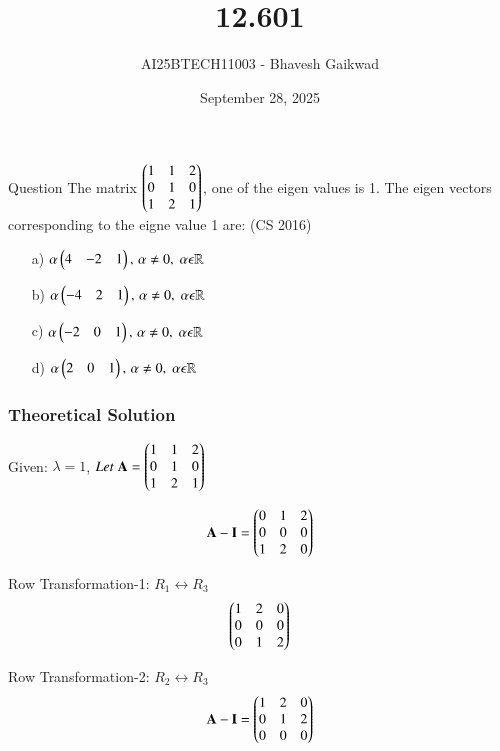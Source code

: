 \documentclass{beamer}
\title
{12.601}
\date{September 28, 2025}
\author 
{AI25BTECH11003 - Bhavesh Gaikwad}
\begin{document}
\frame{\titlepage}
\begin{frame}{Question}
The matrix $\begin{pmatrix}1 & 1 & 2 \\ 0 & 1 & 0 \\ 1 & 2 & 1\end{pmatrix}$, one of the eigen values is 1. The eigen vectors corresponding to the eigne value 1 are:
\hfill{(CS 2016)}\\

\begin{itemize}
    \item[a)] $\alpha\begin{pmatrix}4 & -2 & 1\end{pmatrix}, \, \alpha \neq 0, \; \alpha \epsilon \mathbb{R}$
    \item[b)] $\alpha\begin{pmatrix}-4 & 2 & 1\end{pmatrix}, \, \alpha \neq 0, \; \alpha \epsilon \mathbb{R}$
    \item[c)]$\alpha\begin{pmatrix}-2 & 0 & 1\end{pmatrix}, \, \alpha \neq 0, \; \alpha \epsilon \mathbb{R}$
    \item[d)]$\alpha\begin{pmatrix}2 & 0 & 1\end{pmatrix}, \, \alpha \neq 0, \; \alpha \epsilon \mathbb{R}$
\end{itemize}
\end{frame}


\begin{frame}[fragile]
    \frametitle{Theoretical Solution}
Given: $\lambda = 1$, $Let \; \mathbf{A} = \begin{pmatrix}1 & 1 & 2 \\ 0 & 1 & 0 \\ 1 & 2 & 1\end{pmatrix}$

\begin{equation}
    \mathbf{A} - \mathbf{I} = \begin{pmatrix}0 & 1 & 2 \\ 0 & 0 & 0 \\ 1 & 2 & 0\end{pmatrix}
\end{equation}

Row Transformation-1: $R_1 \leftrightarrow R_3$
\begin{equation}
\begin{pmatrix}1 & 2 & 0 \\ 0 & 0 & 0 \\ 0 & 1 & 2\end{pmatrix}
\end{equation}

Row Transformation-2: $R_2 \leftrightarrow R_3$
\begin{equation}
   \mathbf{A} - \mathbf{I} = \begin{pmatrix}1 & 2 & 0 \\ 0 & 1 & 2 \\ 0 & 0 & 0\end{pmatrix}
\end{equation}
\end{frame}
\end{document}
